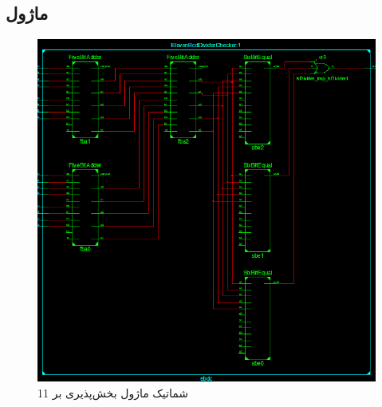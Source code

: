 \documentclass[fleqn]{article}
\begin{document}
\subsection{ماژول }
\begin{figure}[H]
	\centering
	\includegraphics[width=.5\paperwidth]{./Schematic/EBDC.png}
	\caption{شماتیک ماژول بخش‌پذیری بر 11}
	\label{ebdc}
\end{figure}
\end{document}
